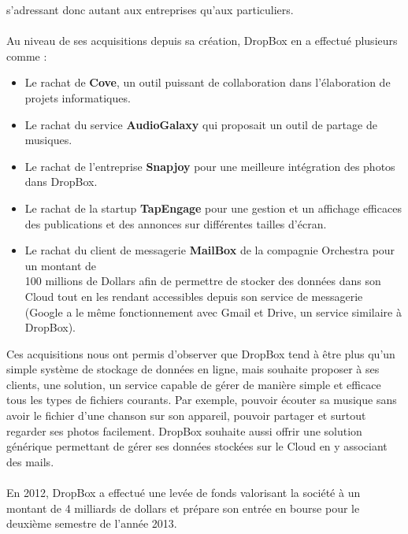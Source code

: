 \documentclass[a4paper, 10pt]{article}
\begin{document}
s'adressant donc autant aux entreprises qu'aux particuliers.\\ \\
Au niveau de ses acquisitions depuis sa création, DropBox en a effectué plusieurs comme :
\begin{itemize}
 \item Le rachat de \textbf{Cove}, un outil puissant de collaboration dans l'élaboration de projets informatiques.
 \item Le rachat du service \textbf{AudioGalaxy} qui proposait un outil de partage de musiques.
 \item Le rachat de l'entreprise \textbf{Snapjoy} pour une meilleure intégration des photos dans DropBox.
 \item Le rachat de la startup \textbf{TapEngage} pour une gestion et un affichage efficaces des publications et des annonces
sur différentes tailles d'écran.
 \item Le rachat du client de messagerie \textbf{MailBox} de la compagnie Orchestra pour un montant de\\100 millions de Dollars
afin de permettre de stocker des données dans son Cloud tout en les rendant accessibles depuis son service de messagerie
(Google a le même fonctionnement avec Gmail et Drive, un service similaire à DropBox).
\end{itemize}
Ces acquisitions nous ont permis d'observer que DropBox tend à être plus qu'un simple système de stockage de données en ligne,
mais souhaite proposer à ses clients, une solution, un service capable de gérer de manière simple et efficace
tous les types de fichiers courants.
Par exemple, pouvoir écouter sa musique sans avoir le fichier d'une chanson sur son appareil,
pouvoir partager et surtout regarder ses photos facilement.
DropBox souhaite aussi offrir une solution générique permettant de gérer ses données stockées sur le Cloud en y associant des mails.\\ \\
En 2012, DropBox a effectué une levée de fonds valorisant la société à un montant de 4 milliards de dollars et
prépare son entrée en bourse pour le deuxième semestre de l'année 2013.
\newpage
\end{document}
